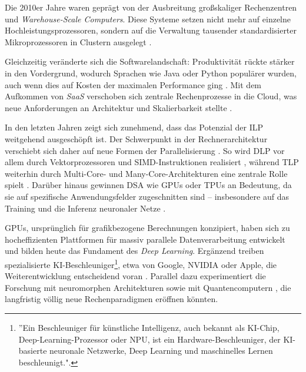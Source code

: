 Die 2010er Jahre waren geprägt von der Ausbreitung großskaliger Rechenzentren und \textit{Warehouse-Scale Computers}. Diese Systeme setzen nicht mehr auf einzelne Hochleistungsprozessoren, sondern auf die Verwaltung tausender standardisierter Mikroprozessoren in Clustern ausgelegt \parencites[S.~6]{hennessy_computer_2011}[S.~158]{kanev_profiling_2015}[S.~29]{mars_heterogeneity_2011}.

Gleichzeitig veränderte sich die Softwarelandschaft: Produktivität rückte stärker in den Vordergrund, wodurch Sprachen wie Java oder Python populärer wurden, auch wenn dies auf Kosten der maximalen Performance ging \parencite[S.~2]{hennessy_computer_2011}. Mit dem Aufkommen von \textit{\ac{SaaS}} verschoben sich zentrale Rechenprozesse in die Cloud, was neue Anforderungen an Architektur und Skalierbarkeit stellte \parencites[S.~158]{kanev_profiling_2015}[S.~29]{mars_heterogeneity_2011}.

In den letzten Jahren zeigt sich zunehmend, dass das Potenzial der \ac{ILP} weitgehend ausgeschöpft ist. Der Schwerpunkt in der Rechnerarchitektur verschiebt sich daher auf neue Formen der Parallelisierung \parencite[S.~10]{hennessy_computer_2019}. So wird \ac{DLP} vor allem durch Vektorprozessoren und \ac{SIMD}-Instruktionen realisiert \parencite[S.~1]{israel_high_2024}, während \ac{TLP} weiterhin durch Multi-Core- und Many-Core-Architekturen eine zentrale Rolle spielt \parencite[S.~10]{hennessy_computer_2019}. Darüber hinaus gewinnen \ac{DSA} wie GPUs oder \ac{TPU}s an Bedeutung, da sie auf spezifische Anwendungsfelder zugeschnitten sind – insbesondere auf das Training und die Inferenz neuronaler Netze \parencite[S.~10]{hennessy_computer_2019}.  

GPUs, ursprünglich für grafikbezogene Berechnungen konzipiert, haben sich zu hocheffizienten Plattformen für massiv parallele Datenverarbeitung entwickelt und bilden heute das Fundament des \textit{Deep Learning}. Ergänzend treiben spezialisierte KI-Beschleuniger\footnote{''Ein Beschleuniger für künstliche Intelligenz, auch bekannt als KI-Chip, Deep-Learning-Prozessor oder \ac{NPU}, ist ein Hardware-Beschleuniger, der KI-basierte neuronale Netzwerke, Deep Learning und maschinelles Lernen beschleunigt."\cite{ibm_was_2024}.}, etwa von Google, NVIDIA oder Apple, die Weiterentwicklung entscheidend voran \cite{richsrdson_10_2025}. Parallel dazu experimentiert die Forschung mit neuromorphen Architekturen \parencite[S.~22]{schuman_survey_2017} sowie mit Quantencomputern \parencite[S.~2f]{preskill_quantum_2018}, die langfristig völlig neue Rechenparadigmen eröffnen könnten.  

